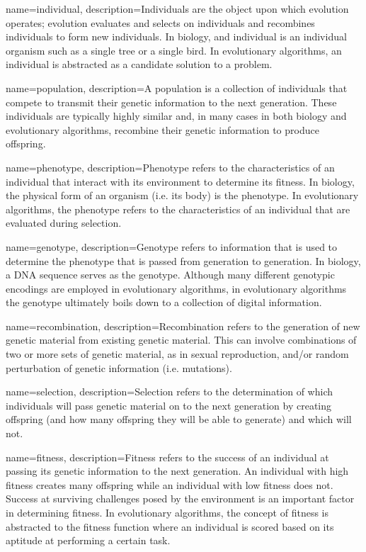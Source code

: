 \makeglossaries
 
{
    name=individual,
    description={Individuals are the object upon which evolution operates; evolution evaluates and selects on individuals and recombines individuals to form new individuals. In biology, and individual is an individual organism such as a single tree or a single bird. In evolutionary algorithms, an individual is abstracted as a candidate solution to a problem.}
}
 
{
    name=population,
    description={A population is a collection of individuals that compete to transmit their genetic information to the next generation. These individuals are typically highly similar and, in many cases in both biology and evolutionary algorithms, recombine their genetic information to produce offspring.}
}

{
    name=phenotype,
    description={Phenotype refers to the characteristics of an individual that interact with its environment to determine its fitness. In biology, the physical form of an organism (i.e. its body) is the phenotype. In evolutionary algorithms, the phenotype refers to the characteristics of an individual that are evaluated during selection.}
}

{
    name=genotype,
    description={Genotype refers to information that is used to determine the phenotype that is passed from generation to generation. In biology, a DNA sequence serves as the genotype. Although many different genotypic encodings are employed in evolutionary algorithms, in evolutionary algorithms the genotype ultimately boils down to a collection of digital information.}
}

{
    name=recombination,
    description={Recombination refers to the generation of new genetic material from existing genetic material. This can involve combinations of two or more sets of genetic material, as in sexual reproduction, and/or random perturbation of genetic information (i.e. mutations).}
}

{
    name=selection,
    description={Selection refers to the determination of which individuals will pass genetic material on to the next generation by creating offspring (and how many offspring they will be able to generate) and which will not.}
}

{
	name=fitness,
    description={Fitness refers to the success of an individual at passing its genetic information to the next generation. An individual with high fitness creates many offspring while an individual with low fitness does not. Success at surviving challenges posed by the environment is an important factor in determining fitness. In evolutionary algorithms, the concept of fitness is abstracted to the fitness function where an individual is scored based on its aptitude at performing a certain task.}
}